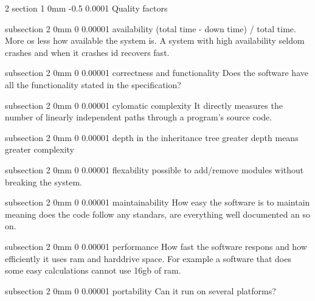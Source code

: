 \documentclass[a4paper,11pt]{article}
\makeatletter
\renewcommand{\section}{\@startsection
   {section}%
   {1}%
   {0mm}%
   {-0.5\baselineskip}%
   {0.0001\baselineskip}%
   {\sffamily\bfseries\upshape\normalsize}}%
\renewcommand{\subsection}{\@startsection
   {subsection}%
   {2}%
   {0mm}%
   {0\baselineskip}%
   {0.00001\baselineskip}%
   {\rmfamily\normalfont\slshape\normalsize}}%
\makeatother
\begin{document}
\begin{multicols}{2}
\section{Quality factors}

\subsection{availability}
(total time - down time) / total time.
More os less how available the system is. A system with high availability seldom crashes and when it crashes id recovers fast.

\subsection{correctness and functionality}
Does the software have all the functionality stated in the specification?

\subsection{cylomatic complexity}
It directly measures the number of linearly independent paths through a program's source code.

\subsection{depth in the inheritance tree}
greater depth means greater complexity

\subsection{flexability}
possible to add/remove modules without breaking the system. 

\subsection{maintainability}
How easy the software is to maintain meaning does the code follow any standars, are everything well documented an so on.

\subsection{performance}
How fast the software respons and how efficiently it uses ram and harddrive space. For example a software that does some easy calculations cannot use 16gb of ram.

\subsection{portability}
Can it run on several platforms?


\end{multicols}
\end{document}
